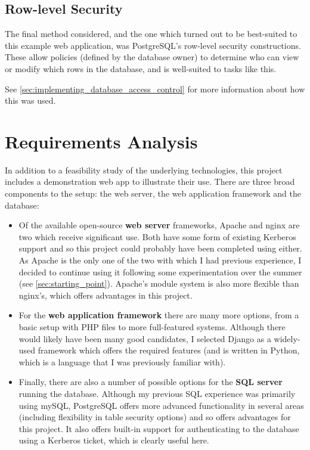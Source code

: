 \documentclass[12pt]{report}
\begin{document}
\subsection{Row-level Security}
The final method considered, and the one which turned out to be best-suited to this example web application, was PostgreSQL's row-level security constructions. These allow policies (defined by the database owner) to determine who can view or modify which rows in the database, and is well-suited to tasks like this.

See \autoref{sec:implementing_database_access_control} for more information about how this was used.

\section{Requirements Analysis}
In addition to a feasibility study of the underlying technologies, this project includes a demonstration web app to illustrate their use. There are three broad components to the setup: the web server, the web application framework and the database:

\begin{itemize}
\item
  Of the available open-source \textbf{web server} frameworks, Apache and nginx are two which receive significant use. Both have some form of existing Kerberos support and so this project could probably have been completed using either. As Apache is the only one of the two with which I had previous experience, I decided to continue using it following some experimentation over the summer (see \autoref{sec:starting_point}). Apache's module system is also more flexible than nginx's, which offers advantages in this project.

\item
  For the \textbf{web application framework} there are many more options, from a basic setup with PHP files to more full-featured systems. Although there would likely have been many good candidates, I selected Django as a widely-used framework which offers the required features (and is written in Python, which is a language that I was previously familiar with).

\item
  Finally, there are also a number of possible options for the \textbf{SQL server} running the database. Although my previous SQL experience was primarily using mySQL, PostgreSQL offers more advanced functionality in several areas (including flexibility in table security options) and so offers advantages for this project. It also offers built-in support for authenticating to the database using a Kerberos ticket, which is clearly useful here.
\end{itemize}
\end{document}
